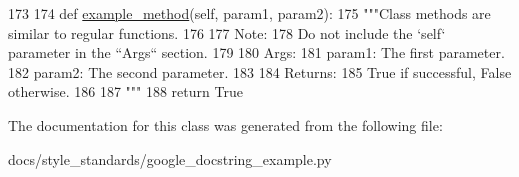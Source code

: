 \begin{DoxyCode}
173 
174     \textcolor{keyword}{def }\hyperlink{classgoogle__docstring__example_1_1ExampleClass_aa1788edcf36597ca202110e4f1e540a1}{example\_method}(self, param1, param2):
175         \textcolor{stringliteral}{"""Class methods are similar to regular functions.}
176 \textcolor{stringliteral}{}
177 \textcolor{stringliteral}{        Note:}
178 \textcolor{stringliteral}{          Do not include the `self` parameter in the ``Args`` section.}
179 \textcolor{stringliteral}{}
180 \textcolor{stringliteral}{        Args:}
181 \textcolor{stringliteral}{          param1: The first parameter.}
182 \textcolor{stringliteral}{          param2: The second parameter.}
183 \textcolor{stringliteral}{}
184 \textcolor{stringliteral}{        Returns:}
185 \textcolor{stringliteral}{          True if successful, False otherwise.}
186 \textcolor{stringliteral}{}
187 \textcolor{stringliteral}{        """}
188         \textcolor{keywordflow}{return} \textcolor{keyword}{True}

\end{DoxyCode}


The documentation for this class was generated from the following file\+:\begin{DoxyCompactItemize}
\item 
docs/style\+\_\+standards/google\+\_\+docstring\+\_\+example.\+py\end{DoxyCompactItemize}
